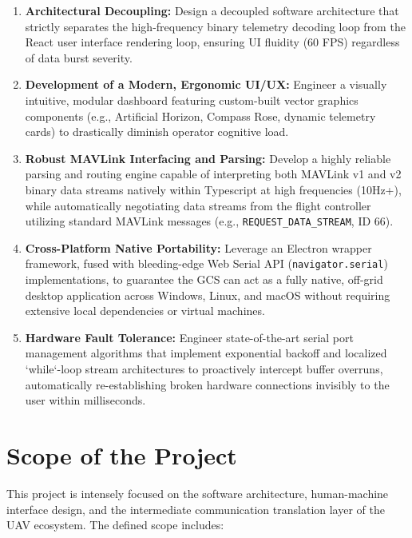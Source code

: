 \begin{enumerate}
    \item \textbf{Architectural Decoupling:} Design a decoupled software architecture that strictly separates the high-frequency binary telemetry decoding loop from the React user interface rendering loop, ensuring UI fluidity (60 FPS) regardless of data burst severity.
    \item \textbf{Development of a Modern, Ergonomic UI/UX:} Engineer a visually intuitive, modular dashboard featuring custom-built vector graphics components (e.g., Artificial Horizon, Compass Rose, dynamic telemetry cards) to drastically diminish operator cognitive load.
    \item \textbf{Robust MAVLink Interfacing and Parsing:} Develop a highly reliable parsing and routing engine capable of interpreting both MAVLink v1 and v2 binary data streams natively within Typescript at high frequencies (10Hz+), while automatically negotiating data streams from the flight controller utilizing standard MAVLink messages (e.g., \texttt{REQUEST\_DATA\_STREAM}, ID 66).
    \item \textbf{Cross-Platform Native Portability:} Leverage an Electron wrapper framework, fused with bleeding-edge Web Serial API (\texttt{navigator.serial}) implementations, to guarantee the GCS can act as a fully native, off-grid desktop application across Windows, Linux, and macOS without requiring extensive local dependencies or virtual machines.
    \item \textbf{Hardware Fault Tolerance:} Engineer state-of-the-art serial port management algorithms that implement exponential backoff and localized `while`-loop stream architectures to proactively intercept buffer overruns, automatically re-establishing broken hardware connections invisibly to the user within milliseconds.
\end{enumerate}

\section{Scope of the Project}
This project is intensely focused on the software architecture, human-machine interface design, and the intermediate communication translation layer of the UAV ecosystem. The defined scope includes:

